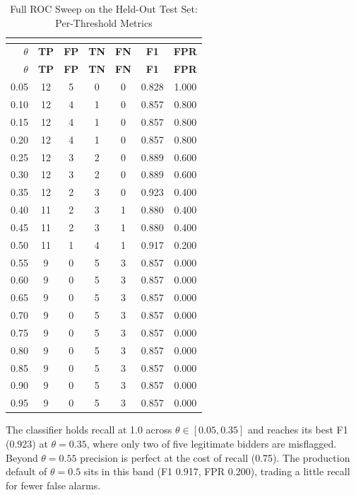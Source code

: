 \documentclass[11pt]{article}
\begin{document}
\begin{longtable}{rcccccc}
\caption{Full ROC Sweep on the Held-Out Test Set: Per-Threshold Metrics} \\
\label{tab:roc_full} \\
\toprule
\textbf{$\theta$} & \textbf{TP} & \textbf{FP} & \textbf{TN} & \textbf{FN} & \textbf{F1} & \textbf{FPR} \\
\midrule
\endfirsthead
\toprule
\textbf{$\theta$} & \textbf{TP} & \textbf{FP} & \textbf{TN} & \textbf{FN} & \textbf{F1} & \textbf{FPR} \\
\midrule
\endhead
0.05 & 12 & 5 & 0 & 0 & 0.828 & 1.000 \\
0.10 & 12 & 4 & 1 & 0 & 0.857 & 0.800 \\
0.15 & 12 & 4 & 1 & 0 & 0.857 & 0.800 \\
0.20 & 12 & 4 & 1 & 0 & 0.857 & 0.800 \\
0.25 & 12 & 3 & 2 & 0 & 0.889 & 0.600 \\
0.30 & 12 & 3 & 2 & 0 & 0.889 & 0.600 \\
0.35 & 12 & 2 & 3 & 0 & 0.923 & 0.400 \\
0.40 & 11 & 2 & 3 & 1 & 0.880 & 0.400 \\
0.45 & 11 & 2 & 3 & 1 & 0.880 & 0.400 \\
0.50 & 11 & 1 & 4 & 1 & 0.917 & 0.200 \\
0.55 & 9 & 0 & 5 & 3 & 0.857 & 0.000 \\
0.60 & 9 & 0 & 5 & 3 & 0.857 & 0.000 \\
0.65 & 9 & 0 & 5 & 3 & 0.857 & 0.000 \\
0.70 & 9 & 0 & 5 & 3 & 0.857 & 0.000 \\
0.75 & 9 & 0 & 5 & 3 & 0.857 & 0.000 \\
0.80 & 9 & 0 & 5 & 3 & 0.857 & 0.000 \\
0.85 & 9 & 0 & 5 & 3 & 0.857 & 0.000 \\
0.90 & 9 & 0 & 5 & 3 & 0.857 & 0.000 \\
0.95 & 9 & 0 & 5 & 3 & 0.857 & 0.000 \\
\bottomrule
\end{longtable}

The classifier holds recall at 1.0 across $\theta \in [0.05, 0.35]$ and
reaches its best F1 (0.923) at $\theta = 0.35$, where only two of five
legitimate bidders are misflagged. Beyond $\theta = 0.55$ precision is
perfect at the cost of recall (0.75). The production default of
$\theta = 0.5$ sits in this band (F1 0.917, FPR 0.200), trading a little
recall for fewer false alarms.
\end{document}
